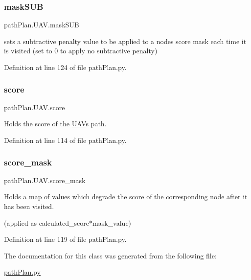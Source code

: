 \subsubsection{\texorpdfstring{mask\+S\+UB}{maskSUB}}
{\footnotesize\ttfamily path\+Plan.\+U\+A\+V.\+mask\+S\+UB}



sets a subtractive penalty value to be applied to a node\textquotesingle{}s score mask each time it is visited (set to 0 to apply no subtractive penalty) 



Definition at line 124 of file path\+Plan.\+py.

\mbox{\label{classpath_plan_1_1_u_a_v_a5f9c3173062f490e98024972e954cb1c}} 
\subsubsection{\texorpdfstring{score}{score}}
{\footnotesize\ttfamily path\+Plan.\+U\+A\+V.\+score}



Holds the score of the \mbox{\hyperlink{classpath_plan_1_1_u_a_v}{U\+AV}}\textquotesingle{}s path. 



Definition at line 114 of file path\+Plan.\+py.

\mbox{\label{classpath_plan_1_1_u_a_v_a998af53f0d27f93e5ad949a09710f995}} 
\subsubsection{\texorpdfstring{score\+\_\+mask}{score\_mask}}
{\footnotesize\ttfamily path\+Plan.\+U\+A\+V.\+score\+\_\+mask}



Holds a map of values which degrade the score of the corresponding node after it has been visited. 

(applied as calculated\+\_\+score$\ast$mask\+\_\+value) 

Definition at line 119 of file path\+Plan.\+py.



The documentation for this class was generated from the following file\+:\begin{DoxyCompactItemize}
\item 
\mbox{\hyperlink{path_plan_8py}{path\+Plan.\+py}}\end{DoxyCompactItemize}
